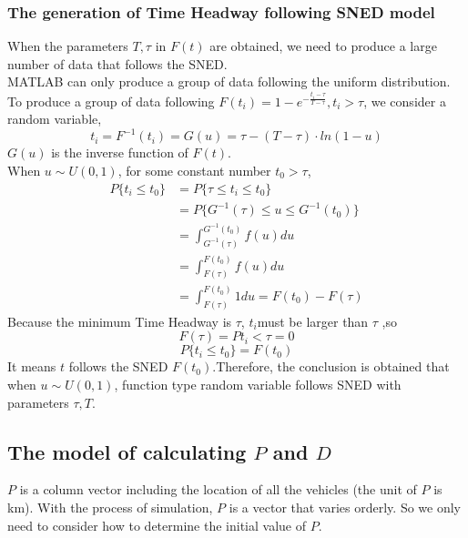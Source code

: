\documentclass{mcmthesis}
\begin{document}
\subsubsection{The generation of Time Headway following SNED model}
\indent When the parameters $T, \tau $ in $F(t)$ are obtained, we need to produce a large number of data that follows the SNED.\\
\indent MATLAB can only produce a group of data following the uniform distribution. To produce a group of data following $ F(t_{i})=1-e^{-\frac{t_{i}-\tau}{T-\tau}},t_{i}>\tau $, we consider a random variable, 
\begin{equation}
	t_{i}=F^{-1}(t_{i})=G(u)=\tau-(T-\tau)\cdot ln(1-u)
\end{equation}
\indent $G(u)$ is the inverse function of $F(t)$.\\
\indent When $ u \sim U(0,1) $, for some constant number $t_{0}>\tau$,\\
\begin{equation}
\begin{split}
	P\{t_{i}\leqslant t_{0}\}&=P\{\tau\leqslant t_{i} \leqslant t_{0} \}\\
&=P\{ G^{-1}(\tau)\leqslant u \leqslant G^{-1}(t_{0})\}\\
&=\int_{G^{-1}(\tau)}^{G^{-1}(t_{0})}f(u)du\\
&=\int_{F(\tau)}^{F(t_{0})}f(u)du\\
&=\int_{F(\tau)}^{F(t_{0})}1du=F(t_{0})-F(\tau)
\end{split}
\end{equation}
\indent Because the minimum Time Headway is $\tau$, $ t_{i} $must be larger than $\tau$ ,so\\
\begin{equation}
	F(\tau)=P{t_{i}<\tau}=0
\end{equation}
\begin{equation}
	P\{t_{i} \leqslant t_{0} \}=F(t_{0})
\end{equation}
\indent It means $t$ follows the SNED $F(t_{0})$.Therefore, the conclusion is obtained that when $ u \sim U(0,1) $, function type random variable follows SNED with parameters $\tau , T $. \\

\subsection{The model of calculating $P$ and $D$}
\indent $P$ is a column vector including the location of all the vehicles (the unit of $P$ is km). With the process of simulation, $P$ is a vector that varies orderly. So we only need to consider how to determine the initial value of $P$.\\
\
\end{document}
